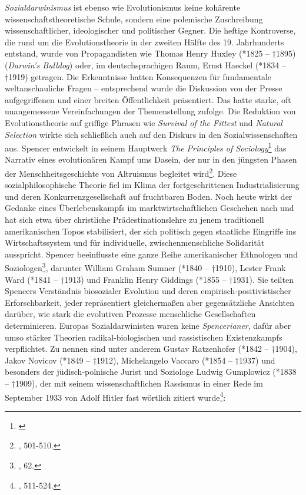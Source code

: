 \documentclass[openany,twoside,twocolumn]{book}
\let\rmarkdownfootnote\footnote%
\def\footnote{\protect\rmarkdownfootnote}
\begin{document}
\emph{Sozialdarwinismus} ist ebenso wie Evolutionismus keine kohärente wissenschaftstheoretische Schule, sondern eine polemische Zuschreibung wissenschaftlicher, ideologischer und politischer Gegner. Die heftige Kontroverse, die rund um die Evolutionstheorie in der zweiten Hälfte des 19. Jahrhunderts entstand, wurde von Propagandisten wie Thomas Henry Huxley (*1825 -- †1895) (\emph{Darwin's Bulldog}) oder, im deutschsprachigen Raum, Ernst Haeckel (*1834 -- †1919) getragen. Die Erkenntnisse hatten Konsequenzen für fundamentale weltanschauliche Fragen -- entsprechend wurde die Diskussion von der Presse aufgegriffenen und einer breiten Öffentlichkeit präsentiert. Das hatte starke, oft unangemessene Vereinfachungen der Themenstellung zufolge. Die Reduktion von Evolutionstheorie auf griffige Phrasen wie \emph{Survival of the Fittest} und \emph{Natural Selection} wirkte sich schließlich auch auf den Diskurs in den Sozialwissenschaften aus. Spencer entwickelt in seinem Hauptwerk \emph{The Principles of Sociology}\footnote{\textcite{SpencerHerbertSpencerPrinciples1898}} das Narrativ eines evolutionären Kampf ums Dasein, der nur in den jüngsten Phasen der Menschheitsgeschichte von Altruismus begleitet wird\footnote{\textcite{petermann_geschichte_2004}, 501-510.}. Diese sozialphilosophische Theorie fiel im Klima der fortgeschrittenen Industrialisierung und deren Konkurrenzgesellschaft auf fruchtbaren Boden. Noch heute wirkt der Gedanke eines Überlebenskampfs im marktwirtschaftlichen Geschehen nach und hat sich etwa über christliche Prädestinationslehre zu jenem traditionell amerikanischen Topos stabilisiert, der sich politisch gegen staatliche Eingriffe ins Wirtschaftssystem und für individuelle, zwischenmenschliche Solidarität ausspricht. Spencer beeinflusste eine ganze Reihe amerikanischer Ethnologen und Soziologen\footnote{\textcite{smith_cultural_1992}, 62.}, darunter William Graham Sumner (*1840 -- †1910), Lester Frank Ward (*1841 -- †1913) und Franklin Henry Giddings (*1855 -- †1931). Sie teilten Spencers Verständnis biosozialer Evolution und deren empirisch-positivistischer Erforschbarkeit, jeder repräsentiert gleichermaßen aber gegensätzliche Ansichten darüber, wie stark die evolutiven Prozesse menschliche Gesellschaften determinieren. Europas Sozialdarwinisten waren keine \emph{Spencerianer}, dafür aber umso stärker Theorien radikal-biologischen und rassistischen Existenzkampfs verpflichtet. Zu nennen sind unter anderem Gustav Ratzenhofer (*1842 -- †1904), Jakov Novicov (*1849 -- †1912), Michelangelo Vaccaro (*1854 -- †1937) und besonders der jüdisch-polnische Jurist und Soziologe Ludwig Gumplowicz (*1838 -- †1909), der mit seinem wissenschaftlichen Rassismus in einer Rede im September 1933 von Adolf Hitler fast wörtlich zitiert wurde\footnote{\textcite{petermann_geschichte_2004}, 511-524.}:
\end{document}
